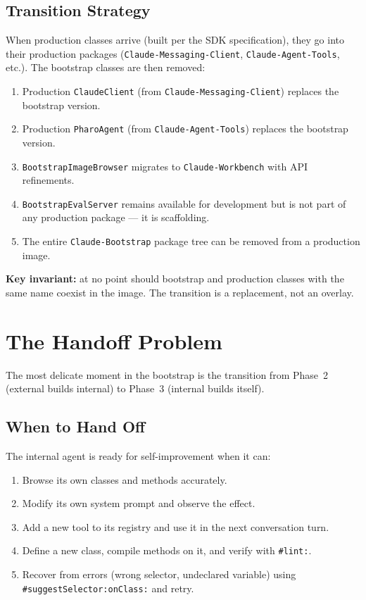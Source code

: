 \documentclass[a4paper,10pt,fleqn]{article}
\newcommand{\cls}[1]{\texttt{#1}}
\newcommand{\sel}[1]{\texttt{\##1}}
\newcommand{\pkg}[1]{\texttt{#1}}
\begin{document}
\subsection{Transition Strategy}

When production classes arrive (built per the SDK specification),
they go into their production packages (\pkg{Claude-Messaging-Client},
\pkg{Claude-Agent-Tools}, etc.).  The bootstrap classes are then
removed:

\begin{enumerate}
  \item Production \cls{ClaudeClient} (from \pkg{Claude-Messaging-Client})
    replaces the bootstrap version.
  \item Production \cls{PharoAgent} (from \pkg{Claude-Agent-Tools})
    replaces the bootstrap version.
  \item \cls{BootstrapImageBrowser} migrates to \pkg{Claude-Workbench}
    with API refinements.
  \item \cls{BootstrapEvalServer} remains available for development but is
    not part of any production package --- it is scaffolding.
  \item The entire \pkg{Claude-Bootstrap} package tree can be removed
    from a production image.
\end{enumerate}

\textbf{Key invariant:} at no point should bootstrap and production
classes with the same name coexist in the image.  The transition is
a replacement, not an overlay.

\section{The Handoff Problem}

The most delicate moment in the bootstrap is the transition from
Phase~2 (external builds internal) to Phase~3 (internal builds itself).

\subsection{When to Hand Off}

The internal agent is ready for self-improvement when it can:

\begin{enumerate}
  \item Browse its own classes and methods accurately.
  \item Modify its own system prompt and observe the effect.
  \item Add a new tool to its registry and use it in the next
    conversation turn.
  \item Define a new class, compile methods on it, and verify with
    \sel{lint:}.
  \item Recover from errors (wrong selector, undeclared variable) using
    \sel{suggestSelector:onClass:} and retry.
\end{enumerate}
\end{document}
